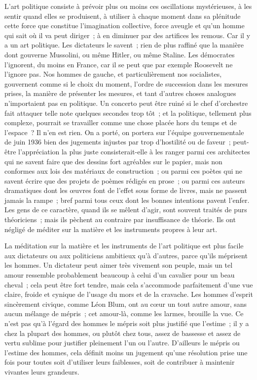 \documentclass[french,twoside]{book} %
\begin{document}
L'art politique consiste à prévoir plus ou moins ces oscillations mysté­rieuses, à les sentir quand elles se produisent, à utiliser à chaque moment dans sa plénitude cette force que constitue l'imagination collective, force aveugle et qu'un homme qui sait où il va peut diriger ; à en diminuer par des artifices les remous. Car il y a un art politique. Les dictateurs le savent ; rien de plus raffiné que la manière dont gouverne Mussolini, ou même Hitler, ou même Staline. Les démocrates l'ignorent, du moins en France, car il se peut que par exemple Roosevelt ne l'ignore pas. Nos hommes de gauche, et particulière­ment nos socialistes, gouvernent comme si le choix du moment, l'ordre de succession dans les mesures prises, la manière de présenter les mesures, et tant d'autres choses analogues n'importaient pas en politique. Un concerto peut être ruiné si le chef d'orchestre fait attaquer telle note quelques secondes trop tôt ; et la politique, tellement plus complexe, pourrait se travailler comme une chose placée hors du temps et de l'espace ? Il n'en est rien. On a porté, on portera sur l'équipe gouvernementale de juin 1936 bien des jugements injustes par trop d'hostilité ou de faveur ; peut-être l'appréciation la plus juste consisterait-elle à les ranger parmi ces architectes qui ne savent faire que des dessins fort agréables sur le papier, mais non conformes aux lois des matériaux de construction ; ou parmi ces poètes qui ne savent écrire que des projets de poèmes rédigés en prose ; ou parmi ces auteurs dramatiques dont les œuvres font de l'effet sous forme de livres, mais ne passent jamais la rampe ; bref parmi tous ceux dont les bonnes intentions pavent l'enfer. Les gens de ce caractère, quand ils se mêlent d'agir, sont souvent traités de purs théoriciens ; mais ils pèchent au contraire par insuffisance de théorie. Ils ont négligé de méditer sur la matière et les instruments propres à leur art.\par
La méditation sur la matière et les instruments de l'art politique est plus facile aux dictateurs ou aux politiciens ambitieux qu'à d'autres, parce qu'ils méprisent les hommes. Un dictateur peut aimer très vivement son peuple, mais un tel amour ressemble probablement beaucoup à celui d'un cavalier pour un beau cheval ; cela peut être fort tendre, mais cela s'accommode parfaitement d'une vue claire, froide et cynique de l'usage du mors et de la cravache. Les hommes d'esprit sincèrement civique, comme Léon Blum, ont au cœur un tout autre amour, sans aucun mélange de mépris ; cet amour-là, comme les larmes, brouille la vue. Ce n'est pas qu'à l'égard des hommes le mépris soit plus justifié que l'estime ; il y a chez la plupart des hommes, ou plutôt chez tous, assez de bassesse et assez de vertu sublime pour justifier pleinement l'un ou l'autre. D'ailleurs le mépris ou l'estime des hommes, cela définit moins un jugement qu'une résolution prise une fois pour toutes soit d'utiliser leurs faiblesses, soit de contribuer à maintenir vivantes leurs grandeurs.\par
\end{document}
